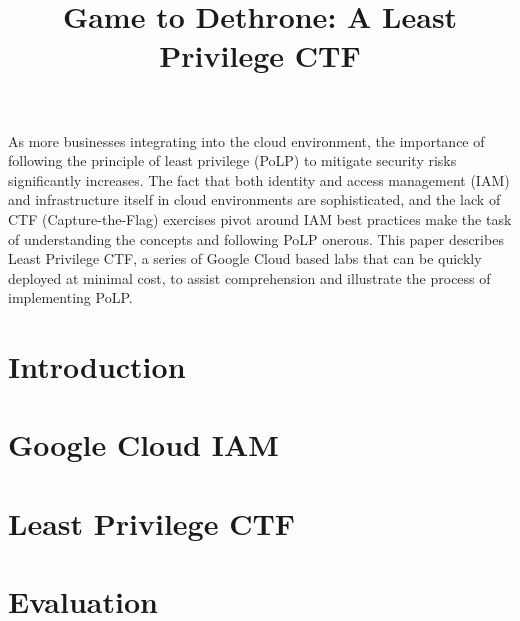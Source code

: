 \documentclass[a4paper,twoside]{article}
\begin{document}
\title{Game to Dethrone: A Least Privilege CTF}


\author{
}

\abstract
{As more businesses integrating into the cloud environment, the importance of following the principle of least privilege (PoLP) to mitigate security risks significantly increases. The fact that both identity and access management (IAM) and infrastructure itself in cloud environments are sophisticated, and the lack of CTF (Capture-the-Flag) exercises pivot around IAM best practices make the task of understanding the concepts and following PoLP onerous. This paper describes Least Privilege CTF, a series of Google Cloud based labs that can be quickly deployed at minimal cost, to assist comprehension and illustrate the process of implementing PoLP.
}

\onecolumn \maketitle \normalsize \setcounter{footnote}{0} \vfill

\section{Introduction}
\label{sec:introduction}



\section{Google Cloud IAM}
\label{sec:gcpiam}


\section{Least Privilege CTF}
\label{sec:ctf}


\section{Evaluation}
\label{sec:eval}

\end{document}
